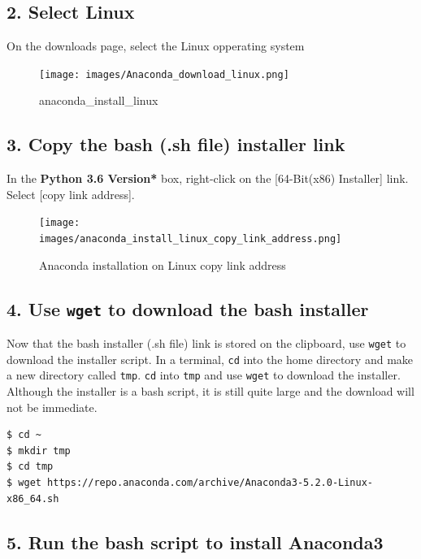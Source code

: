 \documentclass{book}
\begin{document}
    \subsection{2. Select Linux}\label{select-linux}

On the downloads page, select the Linux opperating system

\begin{figure}
\centering
\texttt{[image: images/Anaconda\_download\_linux.png]}
\caption{anaconda\_install\_linux}
\end{figure}

    \subsection{3. Copy the bash (.sh file) installer
link}\label{copy-the-bash-.sh-file-installer-link}

In the \textbf{Python 3.6 Version* } box, right-click on the
{[}64-Bit(x86) Installer{]} link. Select {[}copy link address{]}.

\begin{figure}
\centering
\texttt{[image: images/anaconda\_install\_linux\_copy\_link\_address.png]}
\caption{Anaconda installation on Linux copy link address}
\end{figure}

    \subsection{\texorpdfstring{4. Use \texttt{wget} to download the bash
installer}{4. Use wget to download the bash installer}}\label{use-wget-to-download-the-bash-installer}

Now that the bash installer (.sh file) link is stored on the clipboard,
use \lstinline!wget! to download the installer script. In a terminal,
\lstinline!cd! into the home directory and make a new directory called
\lstinline!tmp!. \lstinline!cd! into \lstinline!tmp! and use
\lstinline!wget! to download the installer. Although the installer is a
bash script, it is still quite large and the download will not be
immediate.

\begin{lstlisting}
$ cd ~
$ mkdir tmp
$ cd tmp
$ wget https://repo.anaconda.com/archive/Anaconda3-5.2.0-Linux-x86_64.sh 
\end{lstlisting}

    \subsection{\texorpdfstring{5. Run the bash script to install
\textbf{Anaconda3}}{5. Run the bash script to install Anaconda3}}\label{run-the-bash-script-to-install-anaconda3}
\end{document}

